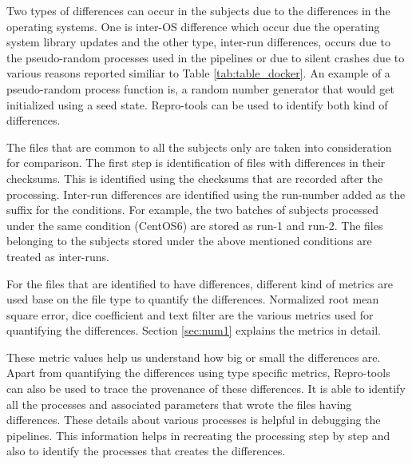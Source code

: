 Two types of differences can occur in the subjects due to the differences in the operating systems. One is inter-OS difference which occur due the operating system library updates and the other type, inter-run differences, occurs due to the pseudo-random processes used in the pipelines or due to silent crashes due to various reasons reported similiar to Table \ref{tab:table_docker}. An example of a pseudo-random process function is, a random number generator that would get initialized using a seed state. Repro-tools can be used to identify both kind of differences.

The files that are common to all the subjects only are taken into consideration for comparison. The first step is identification of files with differences in their checksums. This is identified using the checksums that are recorded after the processing. Inter-run differences are identified using the run-number added as the suffix for the conditions. For example, the two batches of subjects processed under the same condition (CentOS6) are stored as run-1 and run-2. The files belonging to the subjects stored under the above mentioned conditions are treated as inter-runs.

For the files that are identified to have differences, different kind of metrics are used base on the file type to quantify the differences. Normalized root mean square error, dice coefficient and text filter are the various metrics used for quantifying the differences. Section \ref{sec:num1} explains the metrics in detail. 

These metric values help us understand how big or small the differences are. Apart from quantifying the differences using type specific metrics, Repro-tools can also be used to trace the provenance of these differences. It is able to identify all the processes and associated parameters that wrote the files having differences. These details about various processes is helpful in debugging the pipelines. This information helps in recreating the processing step by step and also to identify the processes that creates the differences.

